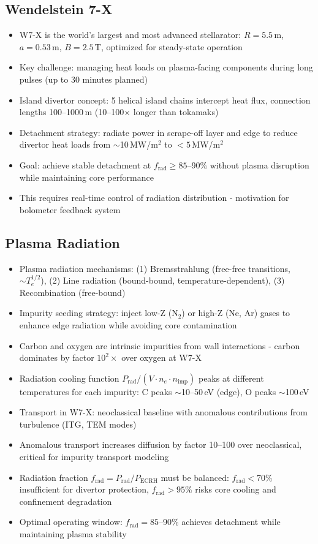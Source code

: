 \documentclass[11pt,a4paper]{article}
\begin{document}
\subsection{Wendelstein 7-X}

\begin{itemize}
\item W7-X is the world's largest and most advanced stellarator: $R=5.5$\,m, $a=0.53$\,m, $B=2.5$\,T, optimized for steady-state operation
\item Key challenge: managing heat loads on plasma-facing components during long pulses (up to 30 minutes planned)
\item Island divertor concept: 5 helical island chains intercept heat flux, connection lengths 100--1000\,m (10--100$\times$ longer than tokamaks)
\item Detachment strategy: radiate power in scrape-off layer and edge to reduce divertor heat loads from $\sim$10\,MW/m$^2$ to $<5$\,MW/m$^2$
\item Goal: achieve stable detachment at $f_{\text{rad}}\geq85$--90\% without plasma disruption while maintaining core performance
\item This requires real-time control of radiation distribution - motivation for bolometer feedback system
\end{itemize}

\subsection{Plasma Radiation}

\begin{itemize}
\item Plasma radiation mechanisms: (1) Bremsstrahlung (free-free transitions, $\sim T_e^{1/2}$), (2) Line radiation (bound-bound, temperature-dependent), (3) Recombination (free-bound)
\item Impurity seeding strategy: inject low-Z (N$_2$) or high-Z (Ne, Ar) gases to enhance edge radiation while avoiding core contamination
\item Carbon and oxygen are intrinsic impurities from wall interactions - carbon dominates by factor $10^2\times$ over oxygen at W7-X
\item Radiation cooling function $P_{\text{rad}}/(V\cdot n_e\cdot n_{\text{imp}})$ peaks at different temperatures for each impurity: C peaks $\sim$10--50\,eV (edge), O peaks $\sim$100\,eV
\item Transport in W7-X: neoclassical baseline with anomalous contributions from turbulence (ITG, TEM modes)
\item Anomalous transport increases diffusion by factor 10--100 over neoclassical, critical for impurity transport modeling
\item Radiation fraction $f_{\text{rad}} = P_{\text{rad}}/P_{\text{ECRH}}$ must be balanced: $f_{\text{rad}}<70\%$ insufficient for divertor protection, $f_{\text{rad}}>95\%$ risks core cooling and confinement degradation
\item Optimal operating window: $f_{\text{rad}}=85$--90\% achieves detachment while maintaining plasma stability
\end{itemize}
\end{document}
